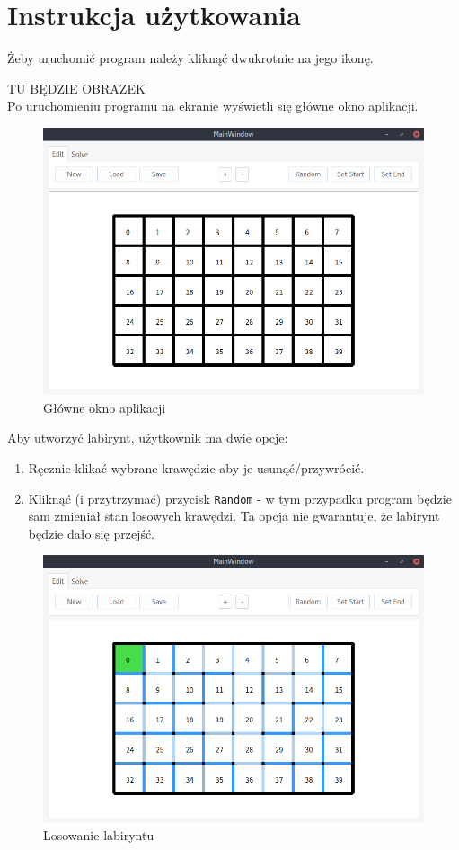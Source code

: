 \documentclass[12pt,a4paper]{article}
\begin{document}
	\section{Instrukcja użytkowania}
	
	Żeby uruchomić program należy kliknąć dwukrotnie na jego ikonę.	
	
	TU BĘDZIE OBRAZEK	\\

	Po uruchomieniu programu na ekranie wyświetli się główne okno
	aplikacji.	
	\begin{figure}[H]
		\centering
		\includegraphics[width=0.8\linewidth]{obrazki/1.png}
		\caption{Główne okno aplikacji}
	\end{figure}
	
	Aby utworzyć labirynt, użytkownik ma dwie opcje:
	\begin{enumerate}
		\item Ręcznie klikać wybrane krawędzie aby je usunąć/przywrócić.
		\item Kliknąć (i przytrzymać) przycisk \texttt{Random} - w tym
			przypadku program będzie sam zmieniał stan losowych
			krawędzi. Ta opcja nie gwarantuje, że labirynt będzie dało
			się przejść.
	\end{enumerate}
	
	\begin{figure}[H]
		\centering
		\includegraphics[width=0.8\linewidth]{obrazki/2.png}
		\caption{Losowanie labiryntu}
	\end{figure}
	
\end{document}

